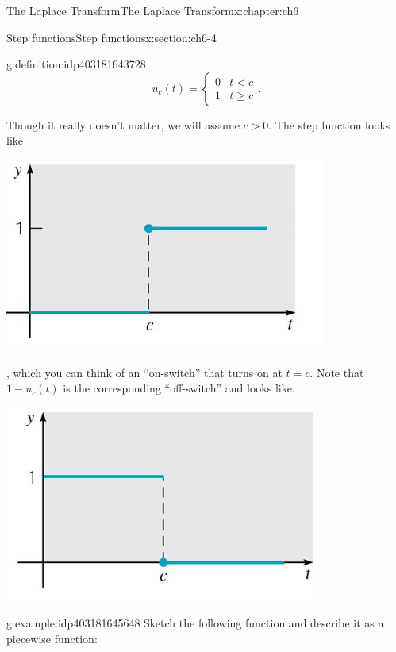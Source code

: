 \documentclass[oneside,10pt,]{book}
\numberwithin{equation}{section}
\numberwithin{equation}{section}
\newcommand{\lt}{<}
\newcommand{\amp}{&}
\begin{document}
\begin{chapterptx}{The Laplace Transform}{}{The Laplace Transform}{}{}{x:chapter:ch6}
\begin{sectionptx}{Step functions}{}{Step functions}{}{}{x:section:ch6-4}
\begin{definition}{}{g:definition:idp403181643728}
\begin{equation*}
u_{c}(t)=\begin{cases}
0 \amp t\lt c\\
1 \amp t\geq c
\end{cases}.
\end{equation*}
%
\end{definition}
Though it really doesn't matter, we will assume \(c>0\). The step function looks like \begin{image}{0.3}{0.4}{0.3}%
\includegraphics[width=\linewidth]{images/6.3-1.jpg}
\end{image}%
, which you can think of an ``on-switch'' that turns on at \(t=c\). Note that \(1-u_{c}(t)\) is the corresponding ``off-switch'' and looks like: \begin{image}{0.3}{0.4}{0.3}%
\includegraphics[width=\linewidth]{images/6.3-2.jpg}
\end{image}%
%
\begin{example}{}{g:example:idp403181645648}%
Sketch the following function and describe it as a piecewise function:%

\end{example}
\end{sectionptx}
\end{chapterptx}
\end{document}
